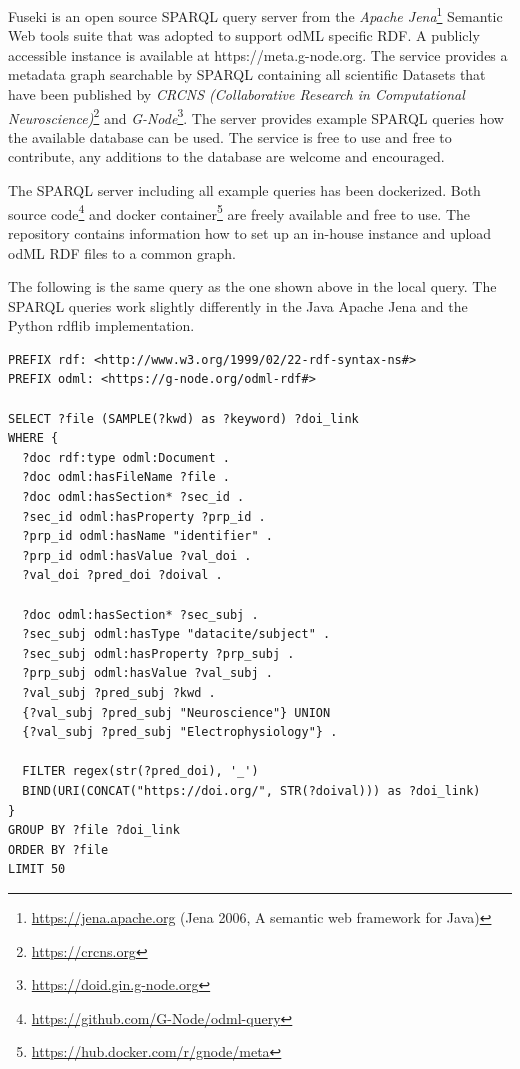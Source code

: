 \documentclass{article}
\begin{document}
Fuseki is an open source SPARQL query server from the \textit{Apache Jena}\footnote{\url{https://jena.apache.org} (Jena 2006, A semantic web framework for Java)} Semantic Web tools suite that was adopted to support odML specific RDF. A publicly accessible instance is available at https://meta.g-node.org. The service provides a metadata graph searchable by SPARQL containing all scientific Datasets that have been published by \textit{CRCNS (Collaborative Research in Computational Neuroscience)}\footnote{\url{https://crcns.org}} and \textit{G-Node}\footnote{\url{https://doid.gin.g-node.org}}. The server provides example SPARQL queries how the available database can be used. The service is free to use and free to contribute, any additions to the database are welcome and encouraged.

The SPARQL server including all example queries has been dockerized. Both source code\footnote{\url{https://github.com/G-Node/odml-query}} and docker container\footnote{\url{https://hub.docker.com/r/gnode/meta}} are freely available and free to use. The repository contains information how to set up an in-house instance and upload odML RDF files to a common graph.

The following is the same query as the one shown above in the local query. The SPARQL queries work slightly differently in the Java Apache Jena and the Python rdflib implementation.

\begin{lstlisting}[label=lst:query_server, caption=Example query server, basicstyle=\small]
PREFIX rdf: <http://www.w3.org/1999/02/22-rdf-syntax-ns#>
PREFIX odml: <https://g-node.org/odml-rdf#>

SELECT ?file (SAMPLE(?kwd) as ?keyword) ?doi_link
WHERE {
  ?doc rdf:type odml:Document .
  ?doc odml:hasFileName ?file .
  ?doc odml:hasSection* ?sec_id .
  ?sec_id odml:hasProperty ?prp_id .
  ?prp_id odml:hasName "identifier" .
  ?prp_id odml:hasValue ?val_doi .
  ?val_doi ?pred_doi ?doival .

  ?doc odml:hasSection* ?sec_subj .
  ?sec_subj odml:hasType "datacite/subject" .
  ?sec_subj odml:hasProperty ?prp_subj .
  ?prp_subj odml:hasValue ?val_subj .
  ?val_subj ?pred_subj ?kwd .
  {?val_subj ?pred_subj "Neuroscience"} UNION
  {?val_subj ?pred_subj "Electrophysiology"} .

  FILTER regex(str(?pred_doi), '_')
  BIND(URI(CONCAT("https://doi.org/", STR(?doival))) as ?doi_link)
}
GROUP BY ?file ?doi_link
ORDER BY ?file
LIMIT 50
\end{lstlisting}
\end{document}
